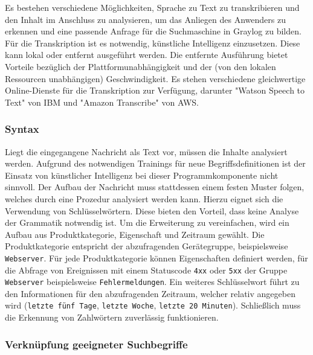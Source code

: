 Es bestehen verschiedene Möglichkeiten, Sprache zu Text zu transkribieren und den Inhalt im Anschluss zu analysieren, um das Anliegen des Anwenders zu erkennen und eine passende Anfrage für die Suchmaschine in Graylog zu bilden. Für die Transkription ist es notwendig, künstliche Intelligenz einzusetzen. Diese kann lokal oder entfernt ausgeführt werden. Die entfernte Ausführung bietet Vorteile bezüglich der Plattformunabhängigkeit und der (von den lokalen Ressourcen unabhängigen) Geschwindigkeit. Es stehen verschiedene gleichwertige Online-Dienste für die Transkription zur Verfügung, darunter "Watson Speech to Text" von IBM und "Amazon Transcribe" von AWS.

\subsubsection{Syntax}
\label{sec:syntax}

Liegt die eingegangene Nachricht als Text vor, müssen die Inhalte analysiert werden. Aufgrund des notwendigen Trainings für neue Begriffsdefinitionen ist der Einsatz von künstlicher Intelligenz bei dieser Programmkomponente nicht sinnvoll. Der Aufbau der Nachricht muss stattdessen einem festen Muster folgen, welches durch eine Prozedur analysiert werden kann. Hierzu eignet sich die Verwendung von Schlüsselwörtern. Diese bieten den Vorteil, dass keine Analyse der Grammatik notwendig ist. Um die Erweiterung zu vereinfachen, wird ein Aufbau aus Produktkategorie, Eigenschaft und Zeitraum gewählt. Die Produktkategorie entspricht der abzufragenden Gerätegruppe, beispielsweise \lstinline{Webserver}. Für jede Produktkategorie können Eigenschaften definiert werden, für die Abfrage von Ereignissen mit einem Statuscode \lstinline{4xx} oder \lstinline{5xx} der Gruppe \lstinline{Webserver} beispielsweise \lstinline{Fehlermeldungen}. Ein weiteres Schlüsselwort führt zu den Informationen für den abzufragenden Zeitraum, welcher relativ angegeben wird (\lstinline{letzte fünf Tage}, \lstinline{letzte Woche}, \lstinline{letzte 20 Minuten}). Schließlich muss die Erkennung von Zahlwörtern zuverlässig funktionieren.

\subsubsection{Verknüpfung geeigneter Suchbegriffe}

